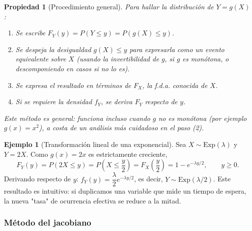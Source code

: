 \documentclass[11pt,a4paper]{article}
\theoremstyle{plain}
\newtheorem{propiedad}[teorema]{Propiedad}
\theoremstyle{definition}
\newtheorem{ejemplo}[teorema]{Ejemplo}
\theoremstyle{remark}
\begin{document}
\begin{propiedad}[Procedimiento general]
Para hallar la distribución de $Y=g(X)$:
\begin{enumerate}[label=(\arabic*)]
\item Se escribe $F_Y(y)=P(Y\le y)=P(g(X)\le y)$.
\item Se despeja la desigualdad $g(X)\le y$ para expresarla como un evento equivalente sobre $X$ (usando la invertibilidad de $g$, si $g$ es monótona, o descomponiendo en casos si no lo es).
\item Se expresa el resultado en términos de $F_X$, la f.d.a. conocida de $X$.
\item Si se requiere la densidad $f_Y$, se deriva $F_Y$ respecto de $y$.
\end{enumerate}
Este método es general: funciona incluso cuando $g$ no es monótona (por ejemplo $g(x)=x^2$), a costa de un análisis más cuidadoso en el paso (2).
\end{propiedad}

\begin{ejemplo}[Transformación lineal de una exponencial]
Sea $X\sim\text{Exp}(\lambda)$ y $Y=2X$. Como $g(x)=2x$ es estrictamente creciente,
$$F_Y(y)=P(2X\le y)=P\left(X\le\frac{y}{2}\right)=F_X\left(\frac y2\right)=1-e^{-\lambda y/2},\qquad y\ge0.$$
Derivando respecto de $y$: $f_Y(y)=\dfrac{\lambda}{2}e^{-\lambda y/2}$, es decir, $Y\sim\text{Exp}(\lambda/2)$. Este resultado es intuitivo: si duplicamos una variable que mide un tiempo de espera, la nueva "tasa" de ocurrencia efectiva se reduce a la mitad.
\end{ejemplo}

\subsubsection{Método del jacobiano}
\end{document}
